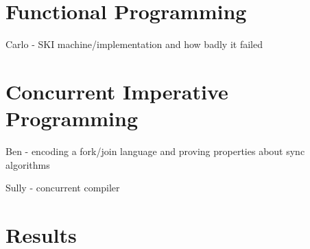 \documentclass{article}
\begin{document}
\section{Functional Programming}

Carlo - SKI machine/implementation and how badly it failed

\section{Concurrent Imperative Programming}

Ben - encoding a fork/join language and proving properties about sync algorithms

Sully - concurrent compiler

\section{Results}

{}

\end{document}
